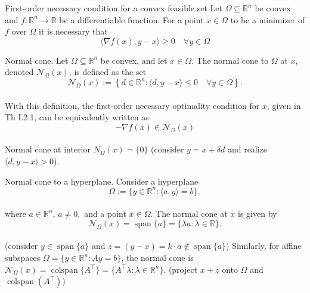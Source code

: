 \begin{theorem}[L2.1]{First-order necessary condition for a convex feasible set}
    Let $\Omega \subseteq \mathbb{R}^n$ be convex and $f: \mathbb{R}^n \rightarrow \mathbb{R}$ be a differentiable function. For a point $x \in \Omega$ to be a minimizer of $f$ over $\Omega$ it is necessary that
    \vspace{-4pt}\\
    $$
    \langle\nabla f(x), y-x\rangle \geq 0 \quad \forall y \in \Omega
    $$
    \vspace{-4pt}
\end{theorem}

\begin{definition}[L2.3]{Normal cone.}
    Let $\Omega \subseteq \mathbb{R}^n$ be convex, and let $x \in \Omega$. The normal cone to $\Omega$ at $x$, denoted $\mathcal{N}_{\Omega}(x)$, is defined as the set
    \vspace{-4pt}\\
    {\footnotesize$$
    \mathcal{N}_{\Omega}(x):=\left\{d \in \mathbb{R}^n:\langle d, y-x\rangle \leq 0 \quad \forall y \in \Omega\right\} .
    $$}
    \vspace{-4pt}\\
    With this definition, the first-order necessary optimality condition for $x$, given in Th L2.1, can be equivalently written as
    \vspace{-4pt}\\
    $$
    -\nabla f(x) \in \mathcal{N}_{\Omega}(x)
    $$
    \vspace{-4pt}\\
    Normal cone at interior $N_{\Omega}(x) = \{0\}$ (consider $y=x+\delta d$ and realize $\langle d, y-x\rangle > 0$).
\end{definition}

\begin{theorem}[L2.2]{Normal cone to a hyperplane.}
    Consider a hyperplane
    \vspace{-4pt}\\
    $$
    \Omega := \{y \in \mathbb{R}^n : \langle a, y \rangle = b\},
    $$
    \vspace{-7pt}\\
    where $a \in \mathbb{R}^n,\, a \neq 0,$
    and a point $x \in \Omega$. The normal cone at $x$ is given by
    \vspace{-4pt}\\
    $$
    \mathcal{N}_{\Omega}(x) = \operatorname{span}\{a\} = \{\lambda a : \lambda \in \mathbb{R}\}.
    $$
    \vspace{-7pt}\\
    (consider $y \in \operatorname{span}\{a\}$ and $z=(y-x) = k\cdot a \notin \operatorname{span}\{a\}$)
    Similarly, for affine subspaces $\Omega = \{y \in \mathbb{R}^n : Ay = b\}$, the normal cone is $\mathcal{N}_{\Omega}(x) = \operatorname{colspan}\{A^\top\} = \{A^\top \lambda : \lambda \in \mathbb{R}^n\}$.
    (project $x+z$ onto $\Omega$ and $\operatorname{colspan}(A^\top)$)
\end{theorem}

